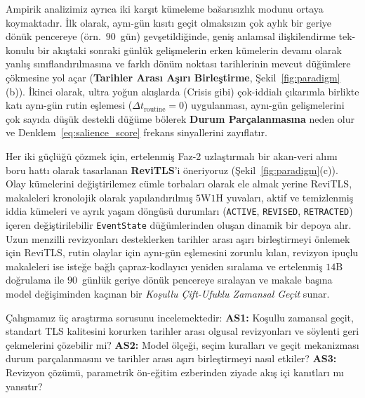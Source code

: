 ﻿\documentclass[journal]{IEEEtran}
\begin{document}
Ampirik analizimiz ayr{\i}ca iki kar\c{s}{\i}t k\"{u}meleme ba\u{s}ar{\i}s{\i}zl{\i}k modunu ortaya koymaktad{\i}r. \.{I}lk olarak, ayn{\i}-g\"{u}n k{\i}s{\i}t{\i} ge\c{c}it olmaks{\i}z{\i}n \c{c}ok ayl{\i}k bir geriye d\"{o}n\"{u}k pencereye (\"{o}rn.\ $90$~g\"{u}n) gev\c{s}etildi\u{g}inde, geni\c{s} anlamsal ili\c{s}kilendirme tek-konulu bir ak{\i}\c{s}taki sonraki g\"{u}nl\"{u}k geli\c{s}melerin erken k\"{u}melerin devam{\i} olarak yanl{\i}\c{s} s{\i}n{\i}fland{\i}r{\i}lmas{\i}na ve farkl{\i} d\"{o}n\"{u}m noktas{\i} tarihlerinin mevcut d\"{u}\u{g}\"{u}mlere \c{c}\"{o}kmesine yol a\c{c}ar (\textbf{Tarihler Aras{\i} A\c{s}{\i}r{\i} Birle\c{s}tirme}, \c{S}ekil~\ref{fig:paradigm}(b)). \.{I}kinci olarak, ultra yo\u{g}un ak{\i}\c{s}larda (Crisis gibi) \c{c}ok-iddial{\i} \c{c}{\i}kar{\i}mla birlikte kat{\i} ayn{\i}-g\"{u}n rutin e\c{s}lemesi ($\Delta t_{\text{routine}}=0$) uygulanmas{\i}, ayn{\i}-g\"{u}n geli\c{s}melerini \c{c}ok say{\i}da d\"{u}\c{s}\"{u}k destekli d\"{u}\u{g}\"{u}me b\"{o}lerek \textbf{Durum Par\c{c}alanmas{\i}na} neden olur ve Denklem~\eqref{eq:salience_score} frekans sinyallerini zay{\i}flat{\i}r.

Her iki g\"{u}\c{c}l\"{u}\u{g}\"{u} \c{c}\"{o}zmek i\c{c}in, ertelenmi\c{s} Faz-2 uzla\c{s}t{\i}rmal{\i} bir akan-veri al{\i}m{\i} boru hatt{\i} olarak tasarlanan \textbf{ReviTLS}'i \"{o}neriyoruz (\c{S}ekil~\ref{fig:paradigm}(c)). Olay k\"{u}melerini de\u{g}i\c{s}tirilemez c\"{u}mle torbalar{\i} olarak ele almak yerine ReviTLS, makaleleri kronolojik olarak yap{\i}land{\i}r{\i}lm{\i}\c{s} $5\text{W}1\text{H}$ yuvalar{\i}, aktif ve temizlenmi\c{s} iddia k\"{u}meleri ve ayr{\i}k ya\c{s}am d\"{o}ng\"{u}s\"{u} durumlar{\i} (\texttt{ACTIVE}, \texttt{REVISED}, \texttt{RETRACTED}) i\c{c}eren de\u{g}i\c{s}tirilebilir \texttt{EventState} d\"{u}\u{g}\"{u}mlerinden olu\c{s}an dinamik bir depoya al{\i}r. Uzun menzilli revizyonlar{\i} desteklerken tarihler aras{\i} a\c{s}{\i}r{\i} birle\c{s}tirmeyi \"{o}nlemek i\c{c}in ReviTLS, rutin olaylar i\c{c}in ayn{\i}-g\"{u}n e\c{s}lemesini zorunlu k{\i}lan, revizyon ipu\c{c}lu makaleleri ise iste\u{g}e ba\u{g}l{\i} \c{c}apraz-kodlay{\i}c{\i} yeniden s{\i}ralama ve ertelenmi\c{s} $14\text{B}$ do\u{g}rulama ile $90$~g\"{u}nl\"{u}k geriye d\"{o}n\"{u}k pencereye s{\i}ralayan ve makale ba\c{s}{\i}na model de\u{g}i\c{s}iminden ka\c{c}{\i}nan bir \textit{Ko\c{s}ullu \c{C}ift-Ufuklu Zamansal Ge\c{c}it} sunar.

\c{C}al{\i}\c{s}mam{\i}z \"{u}\c{c} ara\c{s}t{\i}rma sorusunu incelemektedir: \textbf{AS1:} Ko\c{s}ullu zamansal ge\c{c}it, standart TLS kalitesini korurken tarihler aras{\i} olgusal revizyonlar{\i} ve s\"{o}ylenti geri \c{c}ekmelerini \c{c}\"{o}zebilir mi? \textbf{AS2:} Model \"{o}l\c{c}e\u{g}i, se\c{c}im kurallar{\i} ve ge\c{c}it mekanizmas{\i} durum par\c{c}alanmas{\i}n{\i} ve tarihler aras{\i} a\c{s}{\i}r{\i} birle\c{s}tirmeyi nas{\i}l etkiler? \textbf{AS3:} Revizyon \c{c}\"{o}z\"{u}m\"{u}, parametrik \"{o}n-e\u{g}itim ezberinden ziyade ak{\i}\c{s} i\c{c}i kan{\i}tlar{\i} m{\i} yans{\i}t{\i}r?
\end{document}
